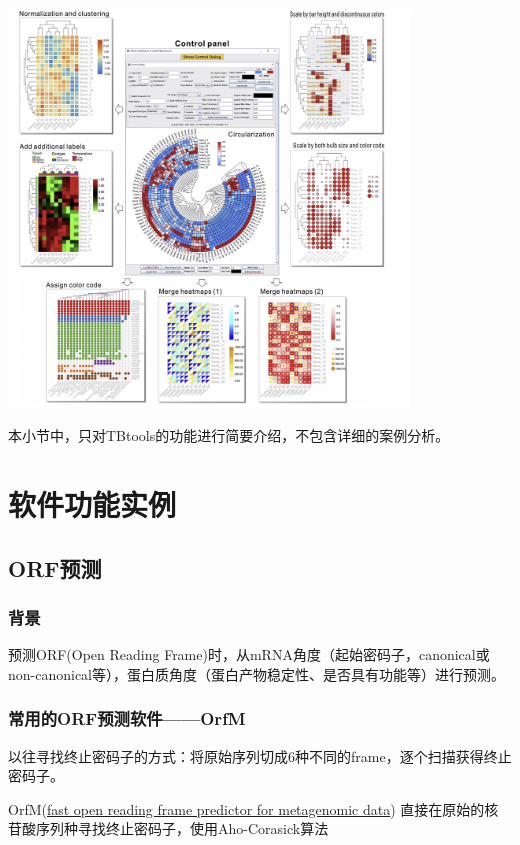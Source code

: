 \includegraphics[width=0.8\textwidth]{./image/gdk/8.1.2.png}

本小节中，只对TBtools的功能进行简要介绍，不包含详细的案例分析。

\section{软件功能实例}

\subsection{ORF预测}
\subsubsection{背景}
预测ORF(Open Reading Frame)时，从mRNA角度（起始密码子，canonical或non-canonical等），蛋白质角度（蛋白产物稳定性、是否具有功能等）进行预测。
\subsubsection{常用的ORF预测软件——OrfM}
以往寻找终止密码子的方式：将原始序列切成6种不同的frame，逐个扫描获得终止密码子。

OrfM(\href{https://security.feishu.cn/link/safety?target=https%3A%2F%2Facademic.oup.com%2Fbioinformatics%2Farticle%2F32%2F17%2F2702%2F2450737&scene=ccm&logParams=%7B%22location%22%3A%22ccm_docs%22%7D&lang=zh-CN}{fast open reading frame predictor for metagenomic data})
直接在原始的核苷酸序列种寻找终止密码子，使用Aho-Corasick算法

